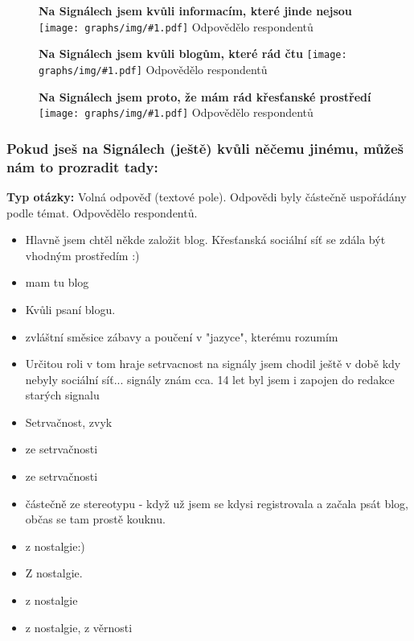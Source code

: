 \documentclass[12pt, a4paper, twoside]{article}
\newcommand{\answercount}[1]{Odpovědělo  respondentů}
\newcommand{\includegraph}[2]{
  \begin{figure}[H]
    \centering
    \textbf{#2}
    \texttt{[image: graphs/img/\#1.pdf]}
    \answercount{#1}
  \end{figure}
}
\newcommand{\qtype}{\textbf{Typ otázky:}
}
\newcommand{\freeEntry}{Volná odpověď (textové pole)}
\begin{document}
\includegraph{proc_signaly_jedinecne_informace}{Na Signálech jsem kvůli informacím, které jinde nejsou}

\includegraph{proc_signaly_oblibene_blogy}{Na Signálech jsem kvůli blogům, které rád čtu}

\includegraph{proc_signaly_krestanske_prostredi}{Na Signálech jsem proto, že mám rád křesťanské prostředí}

\subsubsection{Pokud jseš na Signálech (ještě) kvůli něčemu jinému, můžeš nám to prozradit tady:}

\qtype \freeEntry.
Odpovědi byly částečně uspořádány podle témat.
\answercount{proc_signaly_jine}.

\begin{itemize}
\item Hlavně jsem chtěl někde založit blog. Křesťanská sociální síť se zdála být vhodným prostředím :)

\item mam tu blog

\item Kvůli psaní blogu.

\item zvláštní směsice zábavy  a poučení v "jazyce", kterému rozumím

\item Určitou roli v tom hraje setrvacnost na signály jsem chodil ještě v době kdy nebyly sociální síť... signály znám cca. 14 let byl jsem i zapojen do redakce starých signalu

\item Setrvačnost, zvyk

\item ze setrvačnosti

\item ze setrvačnosti

\item částečně ze stereotypu - když už jsem se kdysi registrovala a začala psát blog, občas se tam prostě kouknu.

\item z nostalgie:)

\item Z nostalgie.

\item z nostalgie

\item z nostalgie, z věrnosti


\end{itemize}
\end{document}
